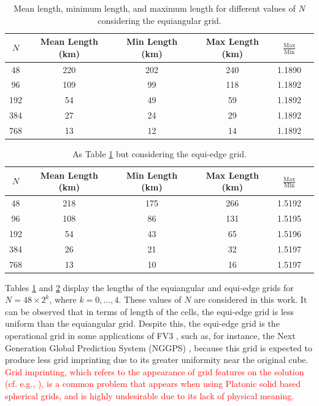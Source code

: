 \documentclass[preprint,12pt]{elsarticle}
\begin{document}
\begin{linenumbers}
\begin{table}[htbp]
	\caption{Mean length, minimum length, and maximum length for different values of $N$ considering the equiangular grid.\label{g2-dx-table}}
	\begin{tabular}{|c|c|c|c|c|c}\hline
		$N$ & Mean Length (km) & Min Length (km) & Max Length (km) & $\frac{\text{Max}}{\text{Min}}$ \\ \hline
		48 & 220 & 202 & 240 & 1.1890 \\
		96 & 109 & 99 & 118  & 1.1892 \\
		192 & 54 & 49 & 59  & 1.1892 \\
		384 & 27 & 24 & 29  & 1.1892 \\
		768 & 13 & 12 & 14  & 1.1892\\
		\hline
	\end{tabular} 
\end{table}
\begin{table}[htbp]
	\centering
	\caption{As Table \ref{g2-dx-table} but considering the equi-edge grid. \label{g0-dx-table}}
	\begin{tabular}{|c|c|c|c|c|c}\hline
		$N$ & Mean Length (km) & Min Length (km) & Max Length (km) & $\frac{\text{Max}}{\text{Min}}$ \\ \hline 
		48 & 218 & 175 & 266 & 1.5192 \\
		96 & 108 & 86 & 131 & 1.5195 \\
		192 & 54 & 43 & 65 & 1.5196 \\
		384 & 26 & 21 & 32 & 1.5197 \\
		768 & 13 & 10 & 16 & 1.5197 \\
		\hline
	\end{tabular}
\end{table}

Tables  \ref{g2-dx-table} and \ref{g0-dx-table} display the lengths of the  equiangular and equi-edge grids for $N=48\times 2^k$, 
where $k = 0,\ldots, 4$. These values of $N$ are considered in this work.
It can be observed that in terms of length of the cells, the equi-edge grid is less uniform than the equiangular grid.
Despite this, the equi-edge grid is the operational grid in some applications of FV3 \cite{harris:2021,chen:2021}, such as, for instance, 
the Next Generation Global Prediction System (NGGPS) \cite{zhou:2019}, 
because this grid is expected to produce less grid imprinting due to its greater uniformity near the original cube.
\textcolor{red}{
Grid imprinting, which refers to the appearance of grid features on the solution (cf. e.g., \cite{peixoto:2013, weller:2012, mouallem:2023}),  is a common problem that appears when using Platonic solid based spherical grids,  and is highly undesirable due to its lack of physical meaning.}


\end{linenumbers}
\end{document}
